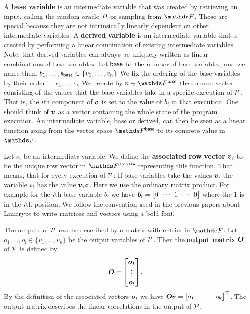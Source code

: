A \textbf{base variable} is an intermediate variable that was created by retrieving an input,
calling the random oracle $\H$ or sampling from $\F$.
These are special because they are not intrinsically linearly dependent on other intermediate variables.
A \textbf{derived variable} is an intermediate variable that is created by performing a linear combination of existing intermediate variables.
Note, that derived variables can always be uniquely written as linear combinations of base variables.
Let $\base$ be the number of base variables,
and we name them $\dts b \base \subset \{\dts v n\}$
We fix the ordering of the base variables by their order in $v_1, \dots, v_n$
We denote by $\vbase \in \Base$ the column vector
consisting of the values that the base variables take in a specific execution of $\P$.
That is, the $i$th component of $\vbase$ is set to the value of $b_i$ in that execution.
One should think of $\vbase$ as a vector containing the whole state of the program execution.
An intermediate variable, base or derived,
can then be seen as a linear function going from the vector space $\Fsp$ to its concrete value in $\F$.

Let $v_i$ be an intermediate variable.
We define the \textbf{associated row vector} $\v v_i$ to be the unique row vector in $\Frowsp$ representing this function.
That means, that for every execution of $\P$:
If base variables take the values $\vbase$,
the variable $v_i$ has the value $\vv_i \vbase$.
Here we use the ordinary matrix product.
For example for the $i$th base variable $b_i$ we have 
$\v b_i = \m{0 & \cdots & 1 & \cdots & 0}$
where the $1$ is in the $i$th position.
We follow the convention used in the previous papers about Linicrypt to write matrices and vectors using a bold font.

The outputs of $\P$ can be described by a matrix with entries in $\F$.
Let $o_1, \dots, o_l \in \{v_1, \dots, v_n \}$ be the output variables of $\P$.
Then the \textbf{output matrix} $\O$ of $\P$ is defined by
\[
  \O =
  \begin{bmatrix}
  \v o_1\\
  \vdots \\
  \v o_l
  \end{bmatrix}.
\]
By the definition of the associated vectors $\v o_i$ we have
$
\O \vbase = 
  \begin{bmatrix} o_1 & \cdots & o_k \end{bmatrix}^\top
$.
The output matrix describes the linear correlations in the output of $\P$.

